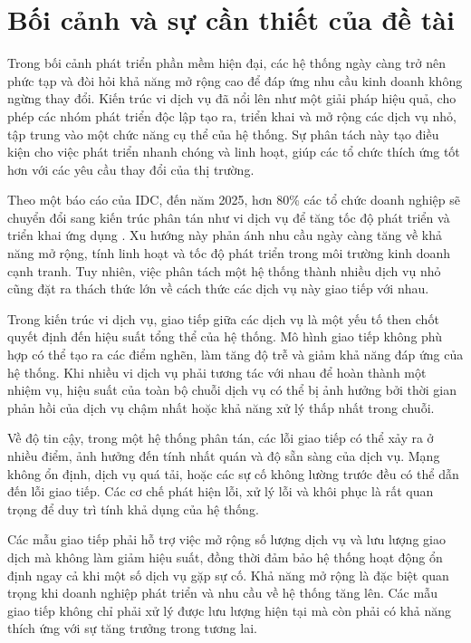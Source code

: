 \section{Bối cảnh và sự cần thiết của đề tài}
Trong bối cảnh phát triển phần mềm hiện đại, các hệ thống ngày càng trở nên
phức tạp và đòi hỏi khả năng mở rộng cao để đáp ứng nhu cầu kinh doanh không
ngừng thay đổi. Kiến trúc vi dịch vụ đã nổi lên như một giải pháp hiệu quả,
cho phép các nhóm phát triển độc lập tạo ra, triển khai và mở rộng các dịch vụ
nhỏ, tập trung vào một chức năng cụ thể của hệ thống. Sự phân tách này tạo điều
kiện cho việc phát triển nhanh chóng và linh hoạt, giúp các tổ chức thích ứng
tốt hơn với các yêu cầu thay đổi của thị trường.

Theo một báo cáo của IDC, đến năm 2025, hơn 80\% các tổ chức doanh nghiệp sẽ
chuyển đổi sang kiến trúc phân tán như vi dịch vụ để tăng tốc độ phát triển
và triển khai ứng dụng \cite{idc2021}. Xu hướng này phản ánh nhu cầu ngày càng tăng về khả
năng mở rộng, tính linh hoạt và tốc độ phát triển trong môi trường kinh doanh
cạnh tranh. Tuy nhiên, việc phân tách một hệ thống thành nhiều dịch vụ nhỏ cũng
đặt ra thách thức lớn về cách thức các dịch vụ này giao tiếp với nhau.

Trong kiến trúc vi dịch vụ, giao tiếp giữa các dịch vụ là một yếu tố then
chốt quyết định đến hiệu suất tổng thể của hệ thống. Mô hình giao tiếp không
phù hợp có thể tạo ra các điểm nghẽn, làm tăng độ trễ và giảm khả năng đáp ứng
của hệ thống. Khi nhiều vi dịch vụ phải tương tác với nhau để hoàn thành một
nhiệm vụ, hiệu suất của toàn bộ chuỗi dịch vụ có thể bị ảnh hưởng bởi thời gian
phản hồi của dịch vụ chậm nhất hoặc khả năng xử lý thấp nhất trong chuỗi.

Về độ tin cậy, trong một hệ thống phân tán, các lỗi giao tiếp có thể xảy ra ở
nhiều điểm, ảnh hưởng đến tính nhất quán và độ sẵn sàng của dịch vụ. Mạng không
ổn định, dịch vụ quá tải, hoặc các sự cố không lường trước đều có thể dẫn đến
lỗi giao tiếp. Các cơ chế phát hiện lỗi, xử lý lỗi và khôi phục là rất quan
trọng để duy trì tính khả dụng của hệ thống.

Các mẫu giao tiếp phải hỗ trợ việc mở rộng số lượng dịch vụ và lưu lượng giao
dịch mà không làm giảm hiệu suất, đồng thời đảm bảo hệ thống hoạt động ổn định
ngay cả khi một số dịch vụ gặp sự cố. Khả năng mở rộng là đặc biệt quan trọng
khi doanh nghiệp phát triển và nhu cầu về hệ thống tăng lên. Các mẫu giao tiếp
không chỉ phải xử lý được lưu lượng hiện tại mà còn phải có khả năng thích ứng
với sự tăng trưởng trong tương lai.

